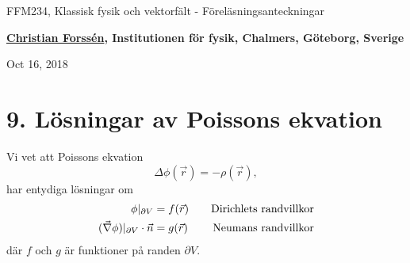 \documentclass[%
oneside,                 %
final,                   %
10pt]{article}
\begin{document}

\newcommand{\exercisesection}[1]{\subsection*{#1}}







\thispagestyle{empty}

\begin{center}
{\LARGE\bf
\begin{spacing}{1.25}
FFM234, Klassisk fysik och vektorfält - Föreläsningsanteckningar
\end{spacing}
}
\end{center}


\begin{center}
{\bf \href{{http://fy.chalmers.se/subatom/tsp/}}{Christian Forssén}, Institutionen för fysik, Chalmers, Göteborg, Sverige${}^{}$} \\ [0mm]
\end{center}

\begin{center}
\end{center}
    

\begin{center}
Oct 16, 2018
\end{center}

\vspace{1cm}


\section*{9. Lösningar av Poissons ekvation}
Vi vet att Poissons ekvation
$$
\Delta \phi(\vec{r}) = - \rho(\vec{r}),
$$
har entydiga lösningar om
\begin{align}
\phi|_{\partial V} &= f(\vec{r}) \quad & \mathrm{Dirichlets~randvillkor} \nonumber \\
(\vec{\nabla}\phi)|_{\partial V} \cdot \vec{n} &= g(\vec{r}) \quad & \mathrm{Neumans~randvillkor} \nonumber 
\end{align}
där $f$ och $g$ är funktioner på randen $\partial V$.
\end{document}

